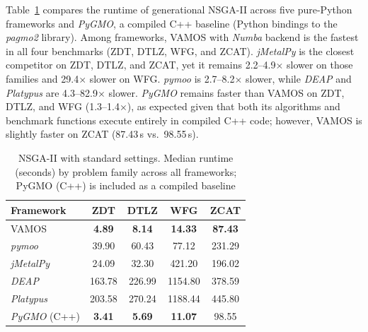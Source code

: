 \documentclass[final,5p,times,twocolumn]{elsarticle}
\newcommand{\VAMOS}{VAMOS}
\begin{document}
Table~\ref{tab:frameworks_perf} compares the runtime of generational NSGA-II across five pure-Python frameworks and \textit{PyGMO}, a compiled C++ baseline (Python bindings to the \textit{pagmo2} library). Among  frameworks, \VAMOS{} with \textit{Numba} backend is the fastest in all four benchmarks (ZDT, DTLZ, WFG, and ZCAT). \textit{jMetalPy} is the closest competitor on ZDT, DTLZ, and ZCAT, yet it remains 2.2--4.9$\times$ slower on those families and 29.4$\times$ slower on WFG. \textit{pymoo} is 2.7--8.2$\times$ slower, while \textit{DEAP} and \textit{Platypus} are 4.3--82.9$\times$ slower. \textit{PyGMO} remains faster than \VAMOS{} on ZDT, DTLZ, and WFG (1.3--1.4$\times$), as expected given that both its algorithms and benchmark functions execute entirely in compiled C++ code; however, \VAMOS{} is slightly faster on ZCAT (87.43\,s vs.\ 98.55\,s).

\begin{table}[htbp]
\centering
\caption{NSGA-II with standard settings. Median runtime (seconds) by problem family across all frameworks; PyGMO (C++) is included as a compiled baseline}
\label{tab:frameworks_perf}
\begin{tabular}{lcccc}
\toprule
\textbf{Framework} & \textbf{ZDT} & \textbf{DTLZ} & \textbf{WFG} & \textbf{ZCAT} \\
\midrule
VAMOS & \textbf{4.89} & \textbf{8.14} & \textbf{14.33} & \textbf{87.43} \\
\textit{pymoo} & 39.90 & 60.43 & 77.12 & 231.29 \\
\textit{jMetalPy} & 24.09 & 32.30 & 421.20 & 196.02 \\
\textit{DEAP} & 163.78 & 226.99 & 1154.80 & 378.59 \\
\textit{Platypus} & 203.58 & 270.24 & 1188.44 & 445.80 \\
\midrule
\textit{PyGMO} (C++) & \textbf{3.41} & \textbf{5.69} & \textbf{11.07} & 98.55 \\
\bottomrule
\end{tabular}
\end{table}
\end{document}
